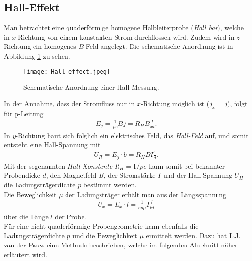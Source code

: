 \subsection{Hall-Effekt}
Man betrachtet eine quaderförmige homogene Halbleiterprobe (\emph{Hall bar}), welche in $x$-Richtung von einem konstanten Strom durchflossen wird. Zudem wird in $z$-Richtung ein homogenes $B$-Feld angelegt. Die schematische Anordnung ist in Abbildung \ref{fig:hall-effect} zu sehen.
\begin{figure}[h]
\centering
\texttt{[image: Hall\_effect.jpeg]}
\caption{Schematische Anordnung einer Hall-Messung. \cite{lit:Iba09}}
\label{fig:hall-effect}
\end{figure}
In der Annahme, dass der Stromfluss nur in $x$-Richtung möglich ist ($j_x=j$), folgt für p-Leitung
\begin{align}
E_y=\frac{1}{pe}Bj=R_H B\frac{I}{bd}.
\end{align}
In $y$-Richtung baut sich folglich ein elektrisches Feld, das \emph{Hall-Feld} auf, und somit entsteht eine Hall-Spannung mit
\begin{align}
U_H=E_y\cdot b=R_H B I\frac{1}{d}.
\end{align}
Mit der sogenannten \emph{Hall-Konstante} $R_H=1/pe$ kann somit bei bekannter Probendicke $d$, den Magnetfeld $B$, der Stromstärke $I$ und der Hall-Spannung $U_H$ die Ladungsträgerdichte $p$ bestimmt werden.\\
Die Beweglichkeit $\mu$ der Ladungsträger erhält man aus der Längsspannung
\begin{align}
U_x=E_x\cdot l=\frac{1}{ep\mu}I\frac{l}{bd}
\end{align}
über die Länge $l$ der Probe.\\
Für eine nicht-quaderförmige Probengeometrie kann ebenfalls die Ladungsträgerdichte $p$ und die Beweglichkeit $\mu$ ermittelt werden. Dazu hat L.J. van der Pauw eine Methode beschrieben, welche im folgenden Abschnitt näher erläutert wird.
